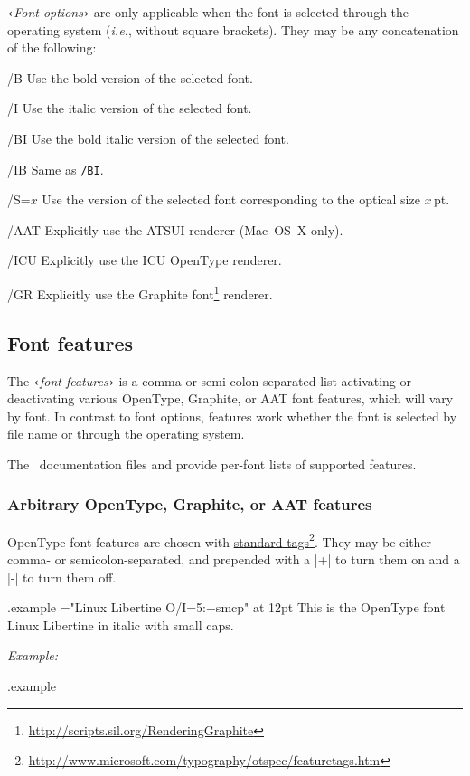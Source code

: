 \documentclass[12pt]{article}
\newenvironment{optdesc}
  {\begin{description}[font=\ttfamily,style=nextline,leftmargin=1.5cm]}
  {\end{description}}
\newcommand\xarg[1]{\texttt‹{\rmfamily\itshape #1}\texttt›}
\edef\examplefilename{\jobname.example}
\newlength\exampleindent
\newenvironment{example}
  {\VerbatimEnvironment
   \begin{VerbatimOut}{\examplefilename}}
  {\end{VerbatimOut}
   \typesetexample}
\newcommand\typesetexample{%
  \begin{trivlist}\item[]
  \vrule
  \hspace{\exampleindent}
  \begin{minipage}{\linewidth-\exampleindent-\exampleindent}
    \textit{Example:}\par
    \vspace{0.4\baselineskip}
    \BVerbatimInput[fontsize=\small]{\examplefilename}\par
    \vspace{0.4\baselineskip}
    \color[rgb]{0.7,0,0}\examplefilename\relax
  \end{minipage}\par
  \end{trivlist}}
\newcommand\hlink[2]{\href{#1}{#2}\footnote{\url{#1}}}
\let\latin\textit
\def\ie{\latin{i.e.}}
\begin{document}
\xarg{Font options} are only applicable when the font is selected
through the operating system (\ie, without square brackets).  They may
be any concatenation of the following:

\begin{optdesc}
\item[/B] Use the bold version of the selected font.
\item[/I] Use the italic version of the selected font.
\item[/BI] Use the bold italic version of the selected font.
\item[/IB] Same as \texttt{/BI}.
\item[/S=$x$] Use the version of the selected font corresponding to the
optical size $x$\,pt.
\item[/AAT] Explicitly use the ATSUI renderer (Mac~OS~X only).
\item[/ICU] Explicitly use the ICU OpenType renderer.
\item[/GR] Explicitly use the Graphite
font\footnote{\url{http://scripts.sil.org/RenderingGraphite}} renderer.
\end{optdesc}


\subsection{Font features}

The \xarg{font features} is a comma or semi-colon separated list
activating or deactivating various OpenType, Graphite, or AAT font
features, which will vary by font.  In contrast to font options,
features work whether the font is selected by file name or through the
operating system.

The \XeTeX\ documentation files  and
 provide per-font lists of supported features.

\subsubsection{Arbitrary OpenType, Graphite, or AAT features}

OpenType font features are chosen with
\hlink{http://www.microsoft.com/typography/otspec/featuretags.htm}{standard
tags}. They may be either comma- or semicolon-separated, and prepended
with a |+| to turn them on and a |-| to turn them off.

\begin{example}
\font\liber="Linux Libertine O/I=5:+smcp" at 12pt
\liber This is the OpenType font Linux Libertine in italic with small caps.
\end{example}
\end{document}
